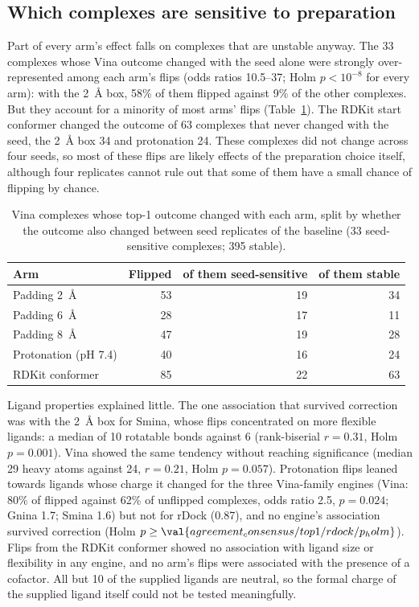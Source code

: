 \subsection{Which complexes are sensitive to preparation}

Part of every arm's effect falls on complexes that are unstable anyway. The 33 complexes
whose Vina outcome changed with the seed alone were strongly over-represented among each
arm's flips (odds ratios 10.5--37; Holm $p < 10^{-8}$ for every arm): with the
\SI{2}{\angstrom} box, 58\% of them flipped against 9\% of the other complexes. But they
account for a minority of most arms' flips (Table~\ref{tab:stable-flips}). The RDKit start
conformer changed the outcome of 63 complexes that never changed with the seed, the
\SI{2}{\angstrom} box 34 and protonation 24. These complexes did not change across four
seeds, so most of these flips are likely effects of the preparation choice itself, although
four replicates cannot rule out that some of them have a small chance of flipping by
chance.

\begin{table}[h]
  \centering
  \caption{Vina complexes whose top-1 outcome changed with each arm, split by whether
    the outcome also changed between seed replicates of the baseline (33 seed-sensitive
    complexes; 395 stable).}
  \label{tab:stable-flips}
  \begin{tabular}{lrrr}
    \toprule
    Arm & Flipped & of them seed-sensitive & of them stable \\
    \midrule
    Padding \SI{2}{\angstrom} & 53 & 19 & 34 \\
    Padding \SI{6}{\angstrom} & 28 & 17 & 11 \\
    Padding \SI{8}{\angstrom} & 47 & 19 & 28 \\
    Protonation (pH 7.4) & 40 & 16 & 24 \\
    RDKit conformer & 85 & 22 & 63 \\
    \bottomrule
  \end{tabular}
\end{table}

Ligand properties explained little. The one association that survived correction was with
the \SI{2}{\angstrom} box for Smina, whose flips concentrated on more flexible ligands: a
median of 10 rotatable bonds against 6 (rank-biserial $r = 0.31$, Holm $p = 0.001$). Vina
showed the same tendency without reaching significance (median 29 heavy atoms against 24,
$r = 0.21$, Holm $p = 0.057$). Protonation flips leaned towards ligands whose charge it
changed for the three Vina-family engines (Vina: 80\% of flipped against 62\% of unflipped
complexes, odds ratio 2.5, $p = 0.024$; Gnina 1.7; Smina 1.6) but not for rDock (0.87),
and no engine's association survived correction (Holm $p \ge \val{agreement_consensus/top1/rdock/p_holm}$). Flips from the RDKit conformer showed no association with ligand size
or flexibility in any engine, and no arm's flips were associated with the presence of a
cofactor. All but 10 of the supplied ligands are neutral, so the formal charge of the
supplied ligand itself could not be tested meaningfully.

